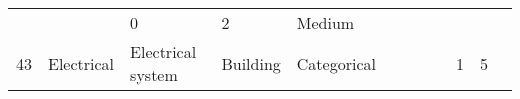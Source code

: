 \documentclass[11pt]{article}
\begin{document}
\begin{longtable}[]{@{}llllllllllll@{}}
\begin{minipage}[t]{0.04\columnwidth}
\strut
\end{minipage} & \begin{minipage}[t]{0.04\columnwidth}\raggedright\strut
\strut
\end{minipage} & \begin{minipage}[t]{0.04\columnwidth}\raggedright\strut
0\strut
\end{minipage} & \begin{minipage}[t]{0.04\columnwidth}\raggedright\strut
2\strut
\end{minipage} & \begin{minipage}[t]{0.04\columnwidth}\raggedright\strut
Medium\strut
\end{minipage}\tabularnewline
\begin{minipage}[t]{0.04\columnwidth}\raggedright\strut
43\strut
\end{minipage} & \begin{minipage}[t]{0.04\columnwidth}\raggedright\strut
Electrical\strut
\end{minipage} & \begin{minipage}[t]{0.04\columnwidth}\raggedright\strut
Electrical system\strut
\end{minipage} & \begin{minipage}[t]{0.04\columnwidth}\raggedright\strut
Building\strut
\end{minipage} & \begin{minipage}[t]{0.04\columnwidth}\raggedright\strut
Categorical\strut
\end{minipage} & \begin{minipage}[t]{0.04\columnwidth}\raggedright\strut
\strut
\end{minipage} & \begin{minipage}[t]{0.04\columnwidth}\raggedright\strut
\strut
\end{minipage} & \begin{minipage}[t]{0.04\columnwidth}\raggedright\strut
\strut
\end{minipage} & \begin{minipage}[t]{0.04\columnwidth}\raggedright\strut
\strut
\end{minipage} & \begin{minipage}[t]{0.04\columnwidth}\raggedright\strut
1\strut
\end{minipage} & \begin{minipage}[t]{0.04\columnwidth}\raggedright\strut
5\strut
\end{minipage} & \begin{minipage}[t]{0.04\columnwidth}\raggedright\strut

\end{minipage}
\end{longtable}
\end{document}
